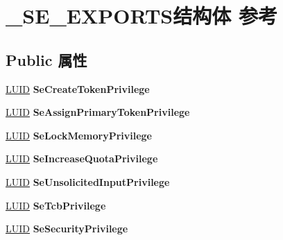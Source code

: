 \hypertarget{struct___s_e___e_x_p_o_r_t_s}{}\section{\+\_\+\+S\+E\+\_\+\+E\+X\+P\+O\+R\+T\+S结构体 参考}
\label{struct___s_e___e_x_p_o_r_t_s}
\subsection*{Public 属性}
\begin{DoxyCompactItemize}
\item 
\mbox{\label{struct___s_e___e_x_p_o_r_t_s_aeb776c256aa3b2fba53d5e87c3afe5a0}} 
\hyperlink{struct___l_u_i_d}{L\+U\+ID} {\bfseries Se\+Create\+Token\+Privilege}
\item 
\mbox{\label{struct___s_e___e_x_p_o_r_t_s_a0eda0c765042aa1dd25849b1cfb9635d}} 
\hyperlink{struct___l_u_i_d}{L\+U\+ID} {\bfseries Se\+Assign\+Primary\+Token\+Privilege}
\item 
\mbox{\label{struct___s_e___e_x_p_o_r_t_s_a2ef5f6f9367a5ac7af7c28b2a4de4598}} 
\hyperlink{struct___l_u_i_d}{L\+U\+ID} {\bfseries Se\+Lock\+Memory\+Privilege}
\item 
\mbox{\label{struct___s_e___e_x_p_o_r_t_s_a40796e6eb908b45ae71a838e9225dd91}} 
\hyperlink{struct___l_u_i_d}{L\+U\+ID} {\bfseries Se\+Increase\+Quota\+Privilege}
\item 
\mbox{\label{struct___s_e___e_x_p_o_r_t_s_a05b6ef97b6ce3bc1b55f92d0ddc7a1be}} 
\hyperlink{struct___l_u_i_d}{L\+U\+ID} {\bfseries Se\+Unsolicited\+Input\+Privilege}
\item 
\mbox{\label{struct___s_e___e_x_p_o_r_t_s_a7362950666fdc4596e4d8155687d4048}} 
\hyperlink{struct___l_u_i_d}{L\+U\+ID} {\bfseries Se\+Tcb\+Privilege}
\item 
\mbox{\label{struct___s_e___e_x_p_o_r_t_s_a6004ce6334459348857f1441cd406395}} 
\hyperlink{struct___l_u_i_d}{L\+U\+ID} {\bfseries Se\+Security\+Privilege}

\end{DoxyCompactItemize}
